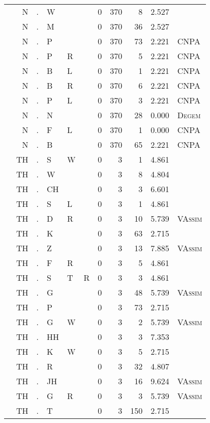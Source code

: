 \begin{longtable}{r@{ } r@{ } c@{ } l@{ } l@{ } l@{ } r r r r l }
 & N & . & W &  &  & 0 & 370 & 8 & 2.527 &  \\
 & N & . & M &  &  & 0 & 370 & 36 & 2.527 &  \\
 & N & . & P &  &  & 0 & 370 & 73 & 2.221 & \textsc{CNPA} \\
 & N & . & P & R &  & 0 & 370 & 5 & 2.221 & \textsc{CNPA} \\
 & N & . & B & L &  & 0 & 370 & 1 & 2.221 & \textsc{CNPA} \\
 & N & . & B & R &  & 0 & 370 & 6 & 2.221 & \textsc{CNPA} \\
 & N & . & P & L &  & 0 & 370 & 3 & 2.221 & \textsc{CNPA} \\
 & N & . & N &  &  & 0 & 370 & 28 & 0.000 & \textsc{Degem} \\
 & N & . & F & L &  & 0 & 370 & 1 & 0.000 & \textsc{CNPA} \\
 & N & . & B &  &  & 0 & 370 & 65 & 2.221 & \textsc{CNPA} \\
 & TH & . & S & W &  & 0 & 3 & 1 & 4.861 &  \\
 & TH & . & W &  &  & 0 & 3 & 8 & 4.804 &  \\
 & TH & . & CH &  &  & 0 & 3 & 3 & 6.601 &  \\
 & TH & . & S & L &  & 0 & 3 & 1 & 4.861 &  \\
 & TH & . & D & R &  & 0 & 3 & 10 & 5.739 & \textsc{VAssim} \\
 & TH & . & K &  &  & 0 & 3 & 63 & 2.715 &  \\
 & TH & . & Z &  &  & 0 & 3 & 13 & 7.885 & \textsc{VAssim} \\
 & TH & . & F & R &  & 0 & 3 & 5 & 4.861 &  \\
 & TH & . & S & T & R & 0 & 3 & 3 & 4.861 &  \\
 & TH & . & G &  &  & 0 & 3 & 48 & 5.739 & \textsc{VAssim} \\
 & TH & . & P &  &  & 0 & 3 & 73 & 2.715 &  \\
 & TH & . & G & W &  & 0 & 3 & 2 & 5.739 & \textsc{VAssim} \\
 & TH & . & HH &  &  & 0 & 3 & 3 & 7.353 &  \\
 & TH & . & K & W &  & 0 & 3 & 5 & 2.715 &  \\
 & TH & . & R &  &  & 0 & 3 & 32 & 4.807 &  \\
 & TH & . & JH &  &  & 0 & 3 & 16 & 9.624 & \textsc{VAssim} \\
 & TH & . & G & R &  & 0 & 3 & 3 & 5.739 & \textsc{VAssim} \\
 & TH & . & T &  &  & 0 & 3 & 150 & 2.715 &  \\

\end{longtable}
